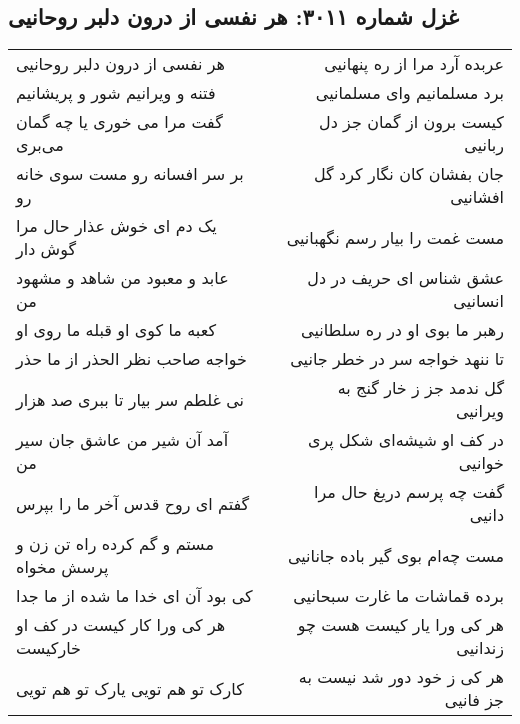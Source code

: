 \begin{center}
\section*{غزل شماره ۳۰۱۱: هر نفسی از درون دلبر روحانیی}
\label{sec:3011}
\begin{longtable}{l p{0.5cm} r}
هر نفسی از درون دلبر روحانیی
&&
عربده آرد مرا از ره پنهانیی
\\
فتنه و ویرانیم شور و پریشانیم
&&
برد مسلمانیم وای مسلمانیی
\\
گفت مرا می خوری یا چه گمان می‌بری
&&
کیست برون از گمان جز دل ربانیی
\\
بر سر افسانه رو مست سوی خانه رو
&&
جان بفشان کان نگار کرد گل افشانیی
\\
یک دم ای خوش عذار حال مرا گوش دار
&&
مست غمت را بیار رسم نگهبانیی
\\
عابد و معبود من شاهد و مشهود من
&&
عشق شناس ای حریف در دل انسانیی
\\
کعبه ما کوی او قبله ما روی او
&&
رهبر ما بوی او در ره سلطانیی
\\
خواجه صاحب نظر الحذر از ما حذر
&&
تا ننهد خواجه سر در خطر جانیی
\\
نی غلطم سر بیار تا ببری صد هزار
&&
گل ندمد جز ز خار گنج به ویرانیی
\\
آمد آن شیر من عاشق جان سیر من
&&
در کف او شیشه‌ای شکل پری خوانیی
\\
گفتم ای روح قدس آخر ما را بپرس
&&
گفت چه پرسم دریغ حال مرا دانیی
\\
مستم و گم کرده راه تن زن و پرسش مخواه
&&
مست چه‌ام بوی گیر باده جانانیی
\\
کی بود آن ای خدا ما شده از ما جدا
&&
برده قماشات ما غارت سبحانیی
\\
هر کی ورا کار کیست در کف او خارکیست
&&
هر کی ورا یار کیست هست چو زندانیی
\\
کارک تو هم تویی یارک تو هم تویی
&&
هر کی ز خود دور شد نیست به جز فانیی
\\
\end{longtable}
\end{center}
